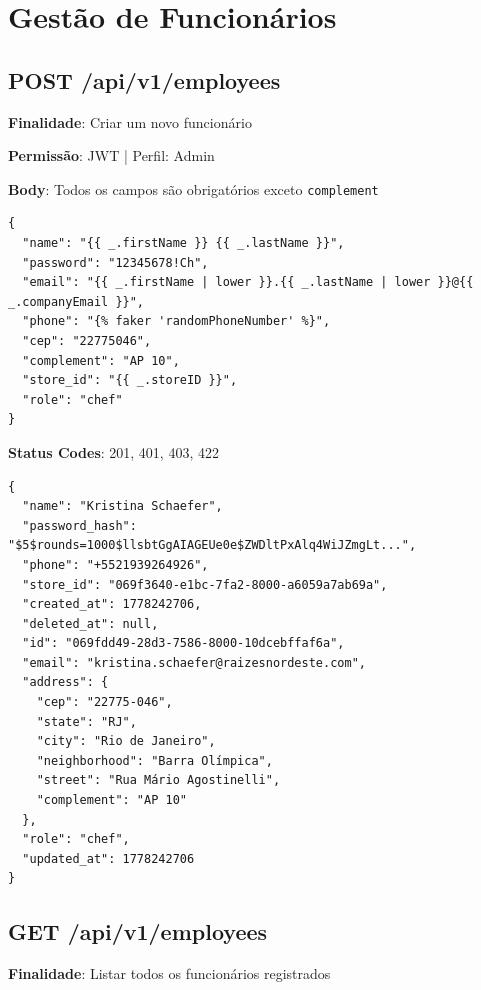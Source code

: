 \section{Gestão de Funcionários}

\subsection{POST /api/v1/employees}

\noindent\textbf{Finalidade}: Criar um novo funcionário

\noindent\textbf{Permissão}: JWT | Perfil: Admin

\noindent\textbf{Body}:
Todos os campos são obrigatórios exceto \texttt{complement}

\vspace{-0.2cm}

\begin{verbatim}
{
  "name": "{{ _.firstName }} {{ _.lastName }}",
  "password": "12345678!Ch",
  "email": "{{ _.firstName | lower }}.{{ _.lastName | lower }}@{{ _.companyEmail }}",
  "phone": "{% faker 'randomPhoneNumber' %}",
  "cep": "22775046",
  "complement": "AP 10",
  "store_id": "{{ _.storeID }}",
  "role": "chef"
}
\end{verbatim}

\noindent\textbf{Status Codes}: 201, 401, 403, 422

\begin{tcolorbox}[colback=green!5, colframe=black, title=\textbf{201 Created}]
\begin{verbatim}
{
  "name": "Kristina Schaefer",
  "password_hash": "$5$rounds=1000$llsbtGgAIAGEUe0e$ZWDltPxAlq4WiJZmgLt...",
  "phone": "+5521939264926",
  "store_id": "069f3640-e1bc-7fa2-8000-a6059a7ab69a",
  "created_at": 1778242706,
  "deleted_at": null,
  "id": "069fdd49-28d3-7586-8000-10dcebffaf6a",
  "email": "kristina.schaefer@raizesnordeste.com",
  "address": {
    "cep": "22775-046",
    "state": "RJ",
    "city": "Rio de Janeiro",
    "neighborhood": "Barra Olímpica",
    "street": "Rua Mário Agostinelli",
    "complement": "AP 10"
  },
  "role": "chef",
  "updated_at": 1778242706
}
\end{verbatim}
\end{tcolorbox}

\subsection{GET /api/v1/employees}

\noindent\textbf{Finalidade}: Listar todos os funcionários registrados

